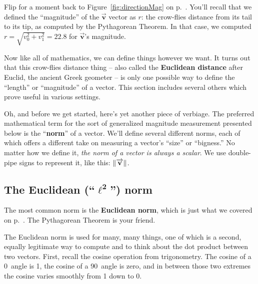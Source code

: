 
Flip for a moment back to Figure~\ref{fig:directionMag} on
p.~\pageref{fig:directionMag}. You'll recall that we defined the ``magnitude''
of the $\overrightarrow{\textbf{v}}$ vector as $r$: the crow-flies distance
from its tail to its tip, as computed by the Pythagorean Theorem. In that case,
we computed $r = \sqrt{v_0^2 + v_1^2} = 22.8$ for
$\overrightarrow{\textbf{v}}$'s magnitude.

Now like all of mathematics, we can define things however we want. It turns out
that this crow-flies distance thing -- also called the \textbf{Euclidean
distance} after Euclid, the ancient Greek geometer -- is only one possible way
to define the ``length'' or ``magnitude'' of a vector. This section includes
several others which prove useful in various settings.


Oh, and before we get started, here's yet another piece of verbiage. The
preferred mathematical term for the sort of generalized magnitude measurement
presented below is the ``\textbf{norm}'' of a vector. We'll define several
different norms, each of which offers a different take on measuring a vector's
``size'' or ``bigness.'' No matter how we define it, \textit{the norm of a
vector is always a scalar}. We use double-pipe signs to represent it, like
this: $\lVert\overrightarrow{\textbf{v}}\rVert$.

\subsection{The Euclidean (``$\boldsymbol\ell^\textbf{2}$'') norm}

\label{Euclideannorm}
The most common norm is the \textbf{Euclidean norm}, which is just what we
covered on p.~\pageref{fig:directionMag}. The Pythagorean Theorem is your
friend.

\label{cosineDotProduct}


The Euclidean norm is used for many, many things, one of which is a second,
equally legitimate way to compute and to think about the dot product between
two vectors. First, recall the cosine operation from trigonometry. The cosine
of a 0\textdegree\ angle is 1, the cosine of a 90\textdegree\ angle is zero,
and in between those two extremes the cosine varies smoothly from 1 down to 0.

